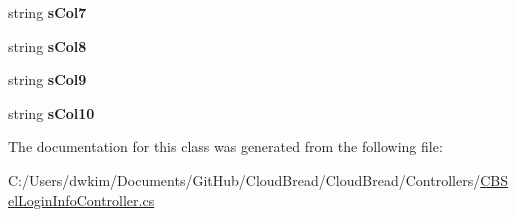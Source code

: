 \begin{DoxyCompactItemize}
\item 
string {\bfseries s\+Col7}\hypertarget{a00150_ada7493ab0de760f11352c73348c4efd7}{}\label{a00150_ada7493ab0de760f11352c73348c4efd7}

\item 
string {\bfseries s\+Col8}\hypertarget{a00150_a9eab54beeab9c4d066294f7974afb9b3}{}\label{a00150_a9eab54beeab9c4d066294f7974afb9b3}

\item 
string {\bfseries s\+Col9}\hypertarget{a00150_aa57cde6efb756aabd0e5adf63749ed33}{}\label{a00150_aa57cde6efb756aabd0e5adf63749ed33}

\item 
string {\bfseries s\+Col10}\hypertarget{a00150_a1d9b4f99280a13d4b82cfa22032f0b16}{}\label{a00150_a1d9b4f99280a13d4b82cfa22032f0b16}

\end{DoxyCompactItemize}


The documentation for this class was generated from the following file\+:\begin{DoxyCompactItemize}
\item 
C\+:/\+Users/dwkim/\+Documents/\+Git\+Hub/\+Cloud\+Bread/\+Cloud\+Bread/\+Controllers/\hyperlink{a00222}{C\+B\+Sel\+Login\+Info\+Controller.\+cs}\end{DoxyCompactItemize}
